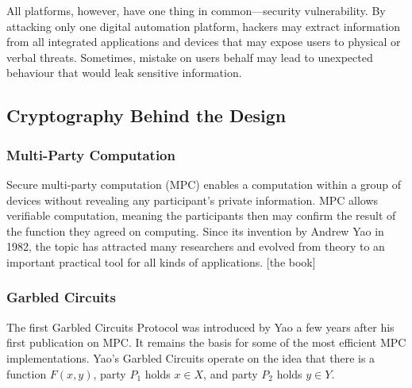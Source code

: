All platforms, however, have one thing in common---security vulnerability. By attacking only one digital
automation platform, hackers may extract information from all integrated applications and devices that
may expose users to physical or verbal threats. Sometimes, mistake on users behalf may lead to
unexpected behaviour that would leak sensitive information. 




\subsection{Cryptography Behind the Design}

\subsubsection{Multi-Party Computation}

Secure multi-party computation (MPC) enables a computation within a group of devices without revealing
any participant's private information. MPC allows verifiable computation, meaning the participants then
may confirm the result of the function they agreed on computing. Since its invention by Andrew Yao in
1982, the topic has attracted many researchers and evolved from theory to an important practical tool for
all kinds of applications. [the book]


\subsubsection{Garbled Circuits}

The first Garbled Circuits Protocol was introduced by Yao a few years after his first publication on MPC. It remains the basis for some of the most efficient MPC implementations. Yao's Garbled Circuits operate on the idea that there is a function $F(x,y)$, party $P_1$ holds $x \in X$, and party $P_2$ holds $y \in Y$.